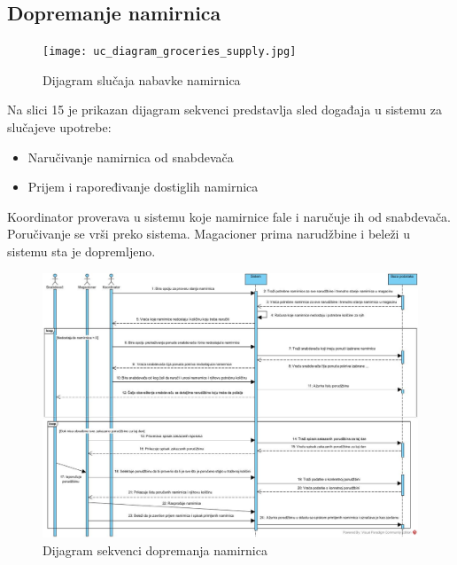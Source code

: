 \subsection{Dopremanje namirnica}
\begin{figure}[H]
\begin{center}
\texttt{[image: uc\_diagram\_groceries\_supply.jpg]}

    \caption{Dijagram slučaja nabavke namirnica}
    \end{center}
\label{fig:Uc_diagram_groceries_supply}
\end{figure}



Na slici 15 je prikazan dijagram sekvenci predstavlja sled događaja u sistemu za slučajeve upotrebe: 
\begin{itemize}
	\item{Naručivanje namirnica od snabdevača}
	\item{Prijem i rapoređivanje dostiglih namirnica}
\end{itemize}

Koordinator proverava u sistemu koje namirnice fale i naručuje ih od snabdevača.
Poručivanje se vrši preko sistema. Magacioner prima narudžbine i beleži u sistemu sta je dopremljeno.


\begin{figure}[H]
	\begin{center}
		\includegraphics[width=\textwidth]{Pictures/seq_diagram_groceries_supply.jpg}
	\end{center}
    \caption{Dijagram sekvenci dopremanja namirnica}
\end{figure}
